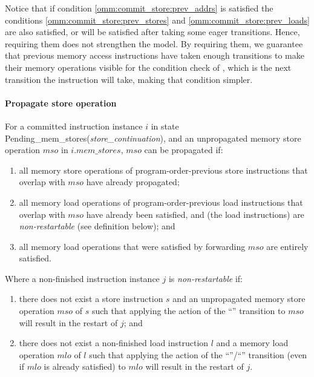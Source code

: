 \begin{commentary}
Notice that if condition \ref{omm:commit_store:prev_addrs} is satisfied the conditions \ref{omm:commit_store:prev_stores} and \ref{omm:commit_store:prev_loads} are also satisfied, or will be satisfied after taking some eager transitions.
Hence, requiring them does not strengthen the model.
By requiring them, we guarantee that previous memory access instructions have taken enough transitions to make their memory operations visible for the condition check of , which is the next transition the instruction will take, making that condition simpler.
\end{commentary}


\paragraph{Propagate store operation}\label{omm:prop_store}
For a committed instruction instance $i$ in state {\sc Pending\_mem\_stores}({\it store\_continuation}), and an unpropagated memory store operation $mso$ in $i.\textit{mem\_stores}$, $mso$ can be propagated if:
\begin{enumerate}
\item all memory store operations of program-order-previous store instructions that overlap with $mso$ have already propagated;
\item all memory load operations of program-order-previous load instructions that overlap with $mso$ have already been satisfied, and (the load instructions) are {\em non-restartable} (see definition below); and
\item all memory load operations that were satisfied by forwarding $mso$ are entirely satisfied.
\end{enumerate}
Where a non-finished instruction instance $j$ is {\em non-restartable} if:
\begin{enumerate}
\item there does not exist a store instruction $s$ and an unpropagated memory store operation $mso$ of $s$ such that applying the action of the ``'' transition to $mso$ will result in the restart of $j$; and
\item there does not exist a non-finished load instruction $l$ and a memory load operation $mlo$ of $l$ such that applying the action of the ``''/``'' transition (even if $mlo$ is already satisfied) to $mlo$ will result in the restart of $j$.
\end{enumerate}
